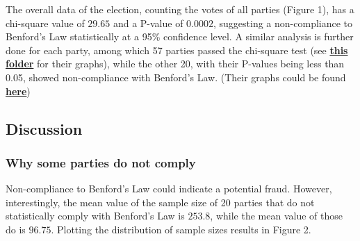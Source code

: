 \documentclass[12pt]{article}
\begin{document}
The overall data of the election, counting the votes of all parties (Figure 1), has a chi-square value of $29.65$ and a P-value of $0.0002$, suggesting a non-compliance to Benford's Law statistically at a 95\% confidence level. A similar analysis is further done for each party, among which 57 parties passed the chi-square test (see \href{https://github.com/pond-nj/Benford-s-Law-Analysis/tree/main/thai\%20election\%20graph/p_moreThan0.05}{\textbf{this folder}} for their graphs), while the other 20, with their P-values being less than 0.05, showed non-compliance with Benford's Law. (Their graphs could be found \href{https://github.com/pond-nj/Benford-s-Law-Analysis/tree/main/thai\%20election\%20graph/p_lessThan0.05}{\textbf{here}})

\subsection{Discussion}
\subsubsection* {Why some parties do not comply}
Non-compliance to Benford's Law could indicate a potential fraud. However, interestingly, the mean value of the sample size of 20 parties that do not statistically comply with Benford's Law is $253.8$, while the mean value of those do is $96.75$. Plotting the distribution of sample sizes results in Figure 2.
\end{document}
